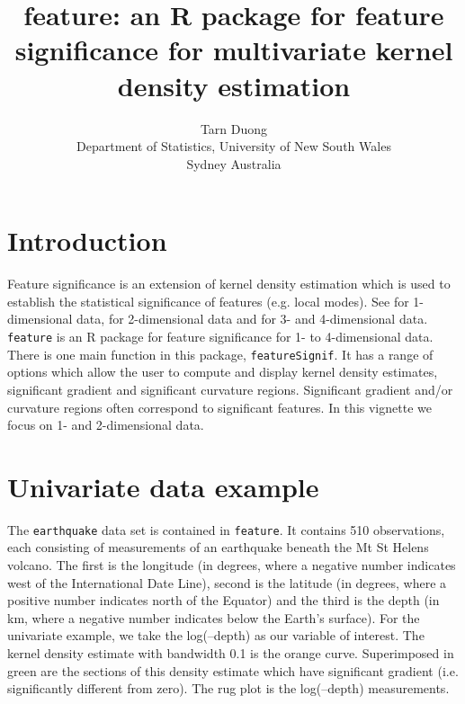 \documentclass[a4paper,11pt]{article}
\title{feature: an R package for feature significance for multivariate
kernel density estimation}
\author{Tarn Duong \\ Department of Statistics, University of New South Wales \\ Sydney Australia}
\begin{document}
\maketitle

\section{Introduction}

Feature significance is an extension of kernel density estimation
which is used to establish the statistical significance of 
features (e.g. local modes). See \citet*{chaudhuri99} for 1-dimensional data,
\citet*{godtliebsen02} for  2-dimensional data and \citet*{duong07}
for 3- and 4-dimensional data. \texttt{feature} is an R package for 
feature significance for 1- to 4-dimensional data.
  There is one main function in this package, \texttt{featureSignif}. 
It has a range of options which allow
the user to compute and display kernel density estimates, significant gradient
and significant curvature regions. Significant gradient and/or
curvature regions often correspond to significant features. 
In this vignette we focus on 1- and 2-dimensional data.


\section{Univariate data example}
The \texttt{earthquake} data set is contained in 
\texttt{feature}. It contains 510 observations, each consisting
of measurements of an earthquake beneath the Mt St Helens volcano.
The first is the longitude (in degrees, where a negative number
indicates west of the International Date Line), second  is
the latitude (in degrees, where a positive number indicates north of
the Equator) and the third  is the depth (in km, where a
negative number indicates below the Earth's surface).
For the univariate example, we take the log(--depth)
as our variable of interest. 
The kernel density estimate with bandwidth 0.1 is the orange curve. 
Superimposed in green 
are the sections of this density estimate which have significant gradient
(i.e. significantly different from zero). The rug plot is 
the log(--depth) measurements.
\end{document}
